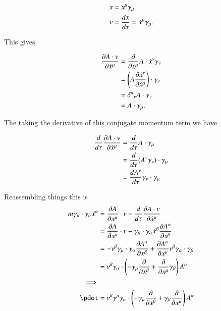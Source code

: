 \begin{align*}
x &= x^\mu \gamma_\mu \\
v &= \frac{dx}{d\tau} = \xdot^\mu \gamma_\mu.
\end{align*}

This gives

\begin{align*}
\PD{\xdot^\mu}{A \cdot v} 
&= \PD{\xdot^\mu}{} A \cdot \xdot^\nu \gamma_\nu \\
&= \left( A \PD{\xdot^\mu}{\xdot^\nu} \right) \cdot \gamma_\nu \\
&= {\delta^\mu}_\nu A \cdot \gamma_\nu \\
&= A \cdot \gamma_\mu.
\end{align*}

The taking the derivative of this conjugate momentum term we have

\begin{align*}
\frac{d}{d\tau} \PD{\xdot^\mu}{A \cdot v} 
&= \frac{d}{d\tau} A \cdot \gamma_\mu \\
&= \frac{d}{d\tau} (A^\nu \gamma_\nu) \cdot \gamma_\mu \\
&= \frac{dA^\nu}{d\tau} \gamma_\nu \cdot \gamma_\mu \\
\end{align*}

Reassembling things this is
\begin{align*}
m \gamma_{\mu} \cdot \gamma_{\alpha} \ddot{x}^{\alpha} &= 
\frac{\partial A}{\partial x^{\mu}} \cdot v -\frac{d}{d\tau} \frac{\partial A \cdot v}{\partial \xdot^{\mu}} \\
&= \frac{\partial A}{\partial x^{\mu}} \cdot v - \gamma_{\mu} \cdot \gamma_{\alpha} \xdot^{\beta} \frac{\partial A^{\alpha}}{\partial x^{\beta}} \\
&= - v^{\beta} \gamma_{\mu} \cdot \gamma_{\alpha} \frac{\partial A^{\alpha}}{\partial x^{\beta}} + \frac{\partial A^{\alpha}}{\partial x^{\mu}} {v}^{\beta} \gamma_{\alpha} \cdot \gamma_{\beta} \\
&= v^{\beta} \gamma_{\alpha} \cdot \left( -\gamma_{\mu} \frac{\partial}{\partial x^{\beta}} + \frac{\partial}{\partial x^{\mu}} \gamma_{\beta} \right) A^{\alpha} \\
\implies \\
\pdot &= v^{\beta} \gamma^{\mu} \gamma_{\alpha} \cdot \left( -\gamma_{\mu} \frac{\partial}{\partial x^{\beta}} + \gamma_{\beta} \frac{\partial}{\partial x^{\mu}} \right) A^{\alpha} \\
\end{align*}

